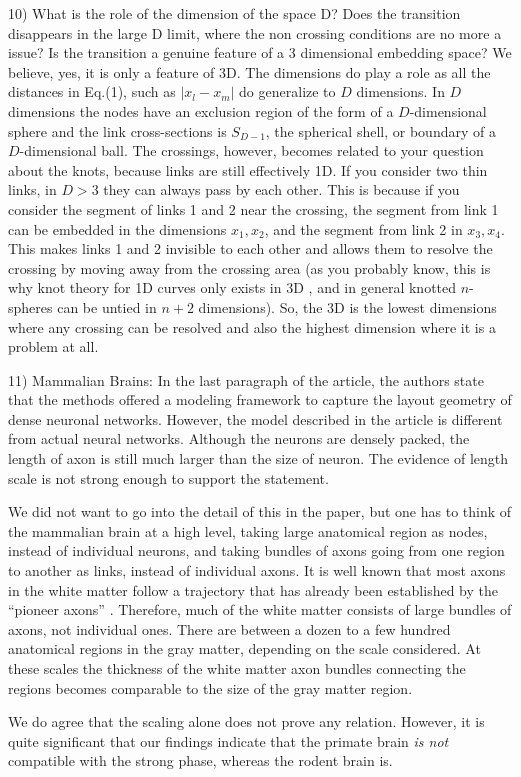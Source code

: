 \documentclass[11pt]{article}
\begin{document}
\begin{response}{
10) What is the role of the dimension of the space D? Does the transition disappears in the large D limit, where the non crossing conditions are no more a issue? Is the transition a genuine feature of a 3 dimensional embedding space?
}
We believe, yes, it is only a feature of 3D.
The dimensions do play a role as all the distances in Eq.(1), such as $|x_l-x_m|$ do generalize to $D$ dimensions. 
In $D$ dimensions the nodes have an exclusion region of the form of a $D$-dimensional sphere and the link cross-sections is $S_{D-1}$, the spherical shell, or boundary of a $D$-dimensional ball. 
The crossings, however, becomes related to your question about the knots, because links are still effectively 1D.
If you consider two thin links, in $D>3$ they can always pass by each other. 
This is because if you consider the segment of links 1 and 2 near the crossing, the segment from link 1 can be embedded in the dimensions $x_1,x_2$, and the segment from link 2 in $x_3,x_4$. 
This makes links 1 and 2 invisible to each other and allows them to resolve the crossing by moving away from the crossing area (as you probably know, this is why knot theory for 1D curves only exists in 3D \cite{zeeman1963unknotting}, and in general knotted $n$-spheres can be untied in $n+2$ dimensions). 
So, the 3D is the lowest dimensions where any crossing can be resolved and also the highest dimension where it is a problem at all.  
\end{response}
\begin{response}{
11) Mammalian Brains: In the last paragraph of the article, the authors state that the methods offered a modeling framework to capture the layout geometry of dense neuronal networks. However, the model described in the article is different from actual neural networks. Although the neurons are densely packed, the length of axon is still much larger than the size of neuron. The evidence of length scale is not strong enough to support the statement. 


}
We did not want to go into the detail of this in the paper, but one has to think of the mammalian brain at a high level, taking large anatomical region as nodes, instead of individual neurons, and taking bundles of axons going from one region to another as links, instead of individual axons. 
It is well known that most axons in the white matter follow a trajectory that has already been established by the ``pioneer axons'' \cite{raper2010cellular}. 
Therefore, much of the white matter consists of large bundles of axons, not individual ones. 
There are between a dozen to a few hundred anatomical regions in the gray matter, depending on the scale considered.
At these scales the thickness of the white matter axon bundles connecting the regions becomes comparable to the size of the gray matter region.

We do agree that the scaling alone does not prove any relation. 
However, it is quite significant that our findings indicate that the primate brain {\em is not} compatible with the strong phase, whereas the rodent brain is. 

\end{response}
\end{document}
